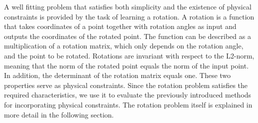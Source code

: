 A well fitting problem that satisfies both simplicity and the existence of physical constraints is provided by the task of learning a rotation. A rotation is a function that takes coordinates of a point together with rotation angles as input and outputs the coordinates of the rotated point.  The function can be described as a multiplication of a rotation matrix, which only depends on the rotation angle, and the point to be rotated. Rotations are invariant with respect to the L2-norm, meaning that the norm of the rotated point equals the norm of the input point. In addition, the determinant of the rotation matrix equals one. These two properties serve as physical constraints. Since the rotation problem satisfies the required characteristics, we use it to evaluate the previously introduced methods for incorporating physical constraints. The rotation problem itself is explained in more detail in the following section.

